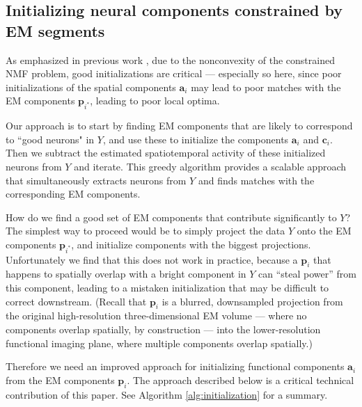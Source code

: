 \documentclass[10pt,letterpaper]{article}
\begin{document}
{\subsection{Initializing neural components constrained by EM segments}
As emphasized in previous work \citep{Pnevmatikakis2016,Zhou2018}, due to the nonconvexity of the constrained NMF problem, good initializations are critical --- especially so here, since poor initializations of the spatial components $\bm{a}_i$  may lead to poor matches with the EM components $\bm{p}_{i^*}$, leading to poor local optima. 

Our approach is to start by finding EM components that are likely to correspond to ``good neurons" in $Y$, and use these to initialize the components $\bm{a}_i$ and $\bm{c}_i$.  Then we subtract the estimated spatiotemporal activity of these initialized neurons from $Y$ and iterate. This greedy algorithm provides a scalable approach that simultaneously extracts neurons from $Y$ and finds matches with the corresponding EM components. 

How do we find a good set of EM components that contribute significantly to $Y$?  The simplest way to proceed would be to simply project the data $Y$ onto the EM components $\bm{p}_{i^*}$, and initialize components with the biggest projections.  Unfortunately we find that this does not work in practice, because a $\bm{p}_i$ that happens to spatially overlap with a bright component in $Y$ can ``steal power'' from this component, leading to a mistaken initialization that may be difficult to correct downstream.  (Recall that $\bm{p}_i$ is a blurred, downsampled projection from the original high-resolution three-dimensional EM volume --- where no components overlap spatially, by construction --- into the lower-resolution functional imaging plane, where multiple components overlap spatially.)

Therefore we need an improved approach for initializing functional components $\bm{a}_i$ from the EM components $\bm{p}_i$.  The approach described below is a critical technical contribution of this paper.  See Algorithm \ref{alg:initialization} for a summary. 

}
\end{document}
